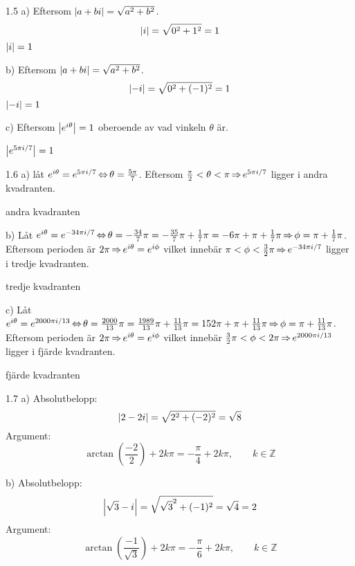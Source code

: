 \begin{task}{1.5 a)}
	Eftersom $\left|a+bi\right|=\sqrt{a^2+b^2}$.
	\[\left|i\right|=\sqrt{0^2+1^2}=1\]
	\ans $\left|i\right|=1$
\end{task}

\begin{task}{b)}
	Eftersom $\left|a+bi\right|=\sqrt{a^2+b^2}$.
	\[\left|-i\right|=\sqrt{0^2+(-1)^2}=1\]
	\ans $\left|-i\right|=1$
\end{task}

\begin{task}{c)}
	Eftersom $\left|e^{i\theta}\right|=1$ oberoende av vad vinkeln $\theta$ är.
	
	\ans $\left|e^{5\pi i/7}\right|=1$
\end{task}

\begin{task}{1.6 a)}
	låt $e^{i\theta}=e^{5\pi i/7} \operatorname{\Leftrightarrow} \theta=\frac{5\pi}{7}$. Eftersom $\frac{\pi}{2}<\theta<\pi \operatorname{\Rightarrow} e^{5\pi i/7}$ ligger i andra kvadranten.
	
	\ans andra kvadranten
\end{task}

\begin{task}{b)}
	Låt 
	$e^{i\theta}=e^{-34\pi i/7} \operatorname{\Leftrightarrow} 
	\theta=
	-\frac{34}{7}\pi=
	-\frac{35}{7}\pi+\frac{1}{7}\pi=
	-6\pi+\pi+\frac{1}{7}\pi \operatorname{\Rightarrow}
	\phi=\pi+\frac{1}{7}\pi$.
	Eftersom perioden är $2\pi \operatorname{\Rightarrow} e^{i\theta} = e^{i\phi}$ vilket innebär $\pi<\phi<\frac{3}{2}\pi \operatorname{\Rightarrow} e^{-34\pi i/7}$ ligger i tredje kvadranten.
	
	\ans tredje kvadranten
\end{task}

\begin{task}{c)}
	Låt 
	$e^{i\theta}=e^{2000\pi i/13} \operatorname{\Leftrightarrow} 
	\theta=
	\frac{2000}{13}\pi=
	\frac{1989}{13}\pi+\frac{11}{13}\pi=
	152\pi+\pi+\frac{11}{13}\pi \operatorname{\Rightarrow}
	\phi=\pi+\frac{11}{13}\pi$.
	Eftersom perioden är $2\pi \operatorname{\Rightarrow} e^{i\theta} = e^{i\phi}$ vilket innebär $\frac{3}{2}\pi<\phi<2\pi \operatorname{\Rightarrow} e^{2000\pi i/13}$ ligger i fjärde kvadranten.
	
	\ans fjärde kvadranten
\end{task}

\begin{task}{1.7 a)}
	Absolutbelopp:
	\[\left|2-2i\right|=\sqrt{2^2+(-2)^2}=\sqrt{8}\]
	Argument:
	\[\arctan\left(\frac{-2}{2}\right)+2k\pi=-\frac{\pi}{4}+2k\pi, \qquad k\in\mathbb{Z}\]
\end{task}

\begin{task}{b)}
	Absolutbelopp:
	\[\left|\sqrt{3}-i\right|=\sqrt{\sqrt{3}^2+(-1)^2}=\sqrt{4}=2\]
	Argument:
	\[\arctan\left(\frac{-1}{\sqrt{3}}\right)+2k\pi=-\frac{\pi}{6}+2k\pi, \qquad k\in\mathbb{Z}\]
\end{task}

